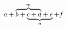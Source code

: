 \documentclass[nofonts]{ctexart}
\begin{document}
\[
	a+ \rlap{$ \overbrace{\phantom{b+c+d}}^m $} b+
	\underbrace{c+d+e}_n +f
\]
\end{document}
